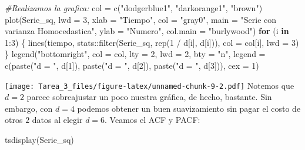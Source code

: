 \documentclass[
]{article}
\newenvironment{Shaded}{\begin{snugshade}}{\end{snugshade}}
\newcommand{\AttributeTok}[1]{\textcolor[rgb]{0.77,0.63,0.00}{#1}}
\newcommand{\CommentTok}[1]{\textcolor[rgb]{0.56,0.35,0.01}{\textit{#1}}}
\newcommand{\ControlFlowTok}[1]{\textcolor[rgb]{0.13,0.29,0.53}{\textbf{#1}}}
\newcommand{\DecValTok}[1]{\textcolor[rgb]{0.00,0.00,0.81}{#1}}
\newcommand{\FunctionTok}[1]{\textcolor[rgb]{0.00,0.00,0.00}{#1}}
\newcommand{\NormalTok}[1]{#1}
\newcommand{\OtherTok}[1]{\textcolor[rgb]{0.56,0.35,0.01}{#1}}
\newcommand{\SpecialCharTok}[1]{\textcolor[rgb]{0.00,0.00,0.00}{#1}}
\newcommand{\StringTok}[1]{\textcolor[rgb]{0.31,0.60,0.02}{#1}}
\begin{document}
\begin{Shaded}
\begin{Highlighting}[]
\CommentTok{\#Realizamos la grafica:}
\NormalTok{col }\OtherTok{=} \FunctionTok{c}\NormalTok{(}\StringTok{"dodgerblue1"}\NormalTok{, }\StringTok{"darkorange1"}\NormalTok{, }\StringTok{"brown"}\NormalTok{)}
\FunctionTok{plot}\NormalTok{(Serie\_sq, }\AttributeTok{lwd =} \DecValTok{3}\NormalTok{, }\AttributeTok{xlab =} \StringTok{"Tiempo"}\NormalTok{, }\AttributeTok{col =} \StringTok{"gray0"}\NormalTok{,}
     \AttributeTok{main =} \StringTok{"Serie con varianza Homocedastica"}\NormalTok{,}
     \AttributeTok{ylab =} \StringTok{"Numero"}\NormalTok{, }\AttributeTok{col.main =} \StringTok{"burlywood"}\NormalTok{)}
\ControlFlowTok{for}\NormalTok{ (i }\ControlFlowTok{in} \DecValTok{1}\SpecialCharTok{:}\DecValTok{3}\NormalTok{) \{}
  \FunctionTok{lines}\NormalTok{(tiempo, stats}\SpecialCharTok{::}\FunctionTok{filter}\NormalTok{(Serie\_sq, }\FunctionTok{rep}\NormalTok{(}\DecValTok{1} \SpecialCharTok{/}\NormalTok{ d[i], d[i])), }\AttributeTok{col =}\NormalTok{ col[i], }
        \AttributeTok{lwd =} \DecValTok{3}\NormalTok{)}
\NormalTok{\}}
\FunctionTok{legend}\NormalTok{(}\StringTok{"bottomright"}\NormalTok{, }\AttributeTok{col =}\NormalTok{ col, }\AttributeTok{lty =} \DecValTok{2}\NormalTok{, }\AttributeTok{lwd =} \DecValTok{2}\NormalTok{, }\AttributeTok{bty =} \StringTok{"n"}\NormalTok{,}
       \AttributeTok{legend =} \FunctionTok{c}\NormalTok{(}\FunctionTok{paste}\NormalTok{(}\StringTok{"d = "}\NormalTok{, d[}\DecValTok{1}\NormalTok{]), }\FunctionTok{paste}\NormalTok{(}\StringTok{"d = "}\NormalTok{, d[}\DecValTok{2}\NormalTok{]),}
                  \FunctionTok{paste}\NormalTok{(}\StringTok{"d = "}\NormalTok{, d[}\DecValTok{3}\NormalTok{])), }\AttributeTok{cex =} \DecValTok{1}\NormalTok{)}
\end{Highlighting}
\end{Shaded}

\texttt{[image: Tarea\_3\_files/figure-latex/unnamed-chunk-9-2.pdf]}
Notemos que \(d=2\) parece sobreajustar un poco nuestra gráfica, de
hecho, bastante. Sin embargo, con \(d=4\) podemos obtener un buen
suavizamiento sin pagar el costo de otros \(2\) datos al elegir \(d=6\).
Veamos el ACF y PACF:

\begin{Shaded}
\begin{Highlighting}[]
\FunctionTok{tsdisplay}\NormalTok{(Serie\_sq)}
\end{Highlighting}
\end{Shaded}
\end{document}
